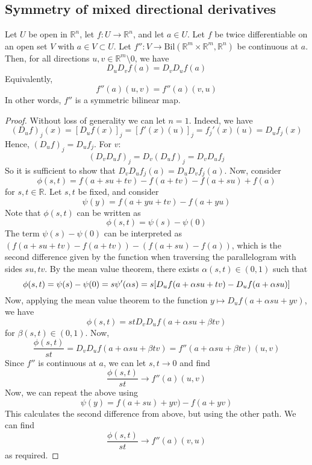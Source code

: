 \subsection{Symmetry of mixed directional derivatives}
\begin{theorem}
	Let \( U \) be open in \( \mathbb R^n \), let \( f \colon U \to \mathbb R^n \), and let \( a \in U \).
	Let \( f \) be twice differentiable on an open set \( V \) with \( a \in V \subset U \).
	Let \( f'' \colon V \to \mathrm{Bil}(\mathbb R^m \times \mathbb R^m, \mathbb R^n) \) be continuous at \( a \).
	Then, for all directions \( u,v \in \mathbb R^m \setminus \qty{0} \), we have
	\[
		D_u D_v f(a) = D_v D_u f(a)
	\]
	Equivalently,
	\[
		f''(a)(u,v) = f''(a)(v,u)
	\]
	In other words, \( f'' \) is a symmetric bilinear map.
\end{theorem}
\begin{proof}
	Without loss of generality we can let \( n = 1 \).
	Indeed, we have
	\[
		(D_u f)_j(x) = [D_u f(x)]_j = [f'(x)(u)]_j = f_j'(x)(u) = D_u f_j(x)
	\]
	Hence, \( (D_u f)_j = D_u f_j \).
	For \( v \):
	\[
		(D_v D_u f)_j = D_v (D_u f)_j = D_v D_u f_j
	\]
	So it is sufficient to show that \( D_v D_u f_j(a) = D_u D_v f_j(a) \).
	Now, consider
	\[
		\phi(s,t) = f(a+su+tv) - f(a+tv) - f(a+su) + f(a)
	\]
	for \( s, t \in \mathbb R \).
	Let \( s, t \) be fixed, and consider
	\[
		\psi(y) = f(a+yu+tv) - f(a+yu)
	\]
	Note that \( \phi(s,t) \) can be written as
	\[
		\phi(s,t) = \psi(s) - \psi(0)
	\]
	The term \( \psi(s) - \psi(0) \) can be interpreted as \( (f(a+su+tv) - f(a+tv)) - (f(a+su) - f(a)) \), which is the second difference given by the function when traversing the parallelogram with sides \( su, tv \).
	By the mean value theorem, there exists \( \alpha(s,t) \in (0,1) \) such that
	\[
		\phi(s,t) = \psi(s) - \psi(0) = s \psi'(\alpha s) = s \qty[ D_u f(a+\alpha s u+ tv) - D_u f(a + \alpha s u) ]
	\]
	Now, applying the mean value theorem to the function \( y \mapsto D_u f(a+\alpha s u + y v) \), we have
	\[
		\phi(s,t) = s t D_v D_u f (a+\alpha s u + \beta t v)
	\]
	for \( \beta(s,t) \in (0,1) \).
	Now,
	\[
		\frac{\phi(s,t)}{st} = D_v D_u f(a+\alpha su + \beta tv) = f''(a+\alpha su + \beta tv)(u,v)
	\]
	Since \( f'' \) is continuous at \( a \), we can let \( s, t \to 0 \) and find
	\[
		\frac{\phi(s,t)}{st} \to f''(a)(u,v)
	\]
	Now, we can repeat the above using
	\[
		\psi(y) = f(a+su) + yv) - f(a+yv)
	\]
	This calculates the second difference from above, but using the other path.
	We can find
	\[
		\frac{\phi(s,t)}{st} \to f''(a)(v,u)
	\]
	as required.
\end{proof}

